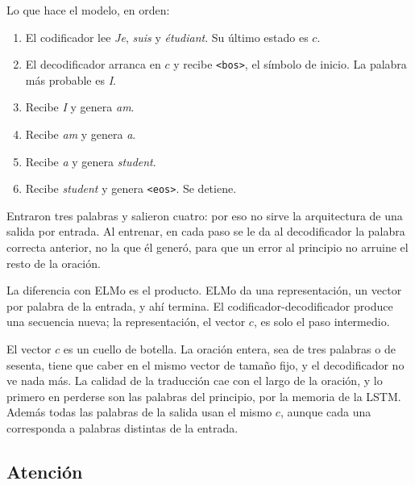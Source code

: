 \documentclass[11pt,letterpaper]{article}
\begin{document}
\begin{ejemplo}
    Lo que hace el modelo, en orden:
    \begin{enumerate}[itemsep=0.2em]
        \item El codificador lee \textit{Je}, \textit{suis} y
              \textit{étudiant}. Su último estado es $c$.
        \item El decodificador arranca en $c$ y recibe \texttt{<bos>},
              el símbolo de inicio. La palabra más probable es
              \textit{I}.
        \item Recibe \textit{I} y genera \textit{am}.
        \item Recibe \textit{am} y genera \textit{a}.
        \item Recibe \textit{a} y genera \textit{student}.
        \item Recibe \textit{student} y genera \texttt{<eos>}. Se
              detiene.
    \end{enumerate}
    Entraron tres palabras y salieron cuatro: por eso no sirve la
    arquitectura de una salida por entrada. Al entrenar, en cada paso
    se le da al decodificador la palabra correcta anterior, no la que
    él generó, para que un error al principio no arruine el resto de la
    oración.
\end{ejemplo}

La diferencia con ELMo es el producto. ELMo da una representación,
un vector por palabra de la entrada, y ahí termina. El
codificador-decodificador produce una secuencia nueva; la
representación, el vector $c$, es solo el paso intermedio.

\begin{ojo}
    El vector $c$ es un cuello de botella. La oración entera, sea de
    tres palabras o de sesenta, tiene que caber en el mismo vector de
    tamaño fijo, y el decodificador no ve nada más. La calidad de la
    traducción cae con el largo de la oración, y lo primero en
    perderse son las palabras del principio, por la memoria de la LSTM.
    Además todas las palabras de la salida usan el mismo $c$, aunque
    cada una corresponda a palabras distintas de la entrada.
\end{ojo}


\subsection*{Atención}
\end{document}
